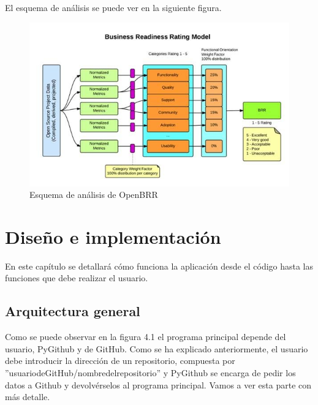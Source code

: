 \documentclass[a4paper, 12pt]{book}
\begin{document}
El esquema de análisis se puede ver en la siguiente figura.

\begin{figure}
  \centering
  \includegraphics[width=14cm, keepaspectratio]{img/openbrr.png}
  \caption{Esquema de análisis de OpenBRR}\label{fig:OpenBRR}
\end{figure}



\cleardoublepage
\chapter{Diseño e implementación}

En este capítulo se detallará cómo funciona la aplicación desde el código hasta las funciones que debe realizar el usuario.

\section{Arquitectura general} 
\label{sec:arquitectura}

Como se puede observar en la figura 4.1 el programa principal depende del usuario, PyGithub y de GitHub. Como se ha explicado anteriormente, el usuario debe introducir la dirección de un repositorio, compuesta por ''usuario\textunderscore de\textunderscore GitHub/nombre\textunderscore del\textunderscore repositorio'' y PyGithub se encarga de pedir los datos a Github y devolvérselos al programa principal. Vamos a ver esta parte con más detalle.
\end{document}
